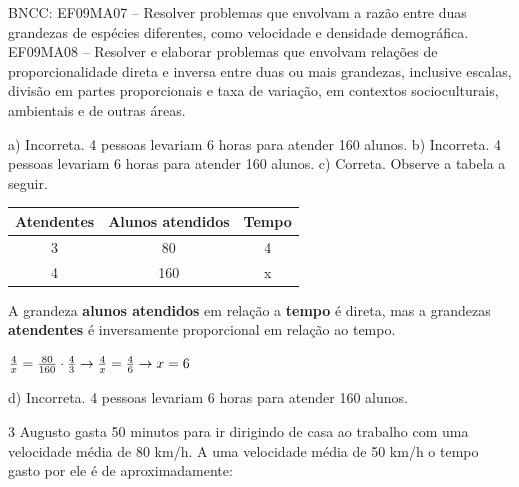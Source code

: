 \begin{escolha}
\begin{boxmedio}
\begin{boxmedio}
{\begin{boxpeq}
\begin{boxpeq}
{\begin{boxpeq}
\begin{boxmedio}
\begin{boxmedio}
\begin{boxpeq}
\begin{boxmedio}
\begin{boxpeq}
\begin{boxpeq}
\begin{boxpeq}
\begin{boxpeq}
\begin{boxmedio}
{\begin{boxmedio}
\begin{boxmedio}
\begin{boxpeq}
\begin{boxmedio}
\begin{boxpeq}
\begin{boxpeq}
\begin{boxpeq}
\begin{escolha}
{\begin{boxmedio}
\begin{boxpeq}
\begin{boxpeq}
\begin{boxpeq}
\begin{boxpeq}
\begin{boxpeq}
\begin{boxmedio}
\begin{boxpeq}
\begin{boxpeq}
\begin{boxpeq}
{\begin{boxpeq}
\begin{boxmedio}
\begin{boxpeq}
\begin{boxpeq}
\begin{boxpeq}
{\begin{boxpeq}
\begin{boxmedio}
{BNCC: EF09MA07 --  Resolver problemas que envolvam a razão entre duas grandezas de espécies diferentes, como velocidade e densidade demográfica.
EF09MA08 -- Resolver e elaborar problemas que envolvam relações de proporcionalidade direta e inversa entre duas ou mais grandezas, inclusive escalas, divisão em partes proporcionais e taxa de variação, em contextos socioculturais, ambientais e de outras áreas.

a) Incorreta. 4 pessoas levariam 6 horas para atender 160 alunos.
b) Incorreta. 4 pessoas levariam 6 horas para atender 160 alunos.
c) Correta. Observe a tabela a seguir.
\begin{table}[]
\begin{tabular}{|c|c|c|}
\hline
\rowcolor[HTML]{DAE8FC} 
Atendentes & Alunos atendidos & Tempo \\ \hline
3 & 80 & 4 \\ \hline
4 & 160 & x \\ \hline
\end{tabular}
\end{table}

A grandeza \textbf{alunos atendidos} em relação a \textbf{tempo} é direta,
mas a grandezas \textbf{atendentes} é inversamente proporcional em relação 
ao tempo.

$\frac{4}{x} = \frac{80}{160} \cdot \frac{4}{3} \rightarrow \\
\frac{4}{x} = \frac{4}{6} \rightarrow x = 6$

d) Incorreta. 4 pessoas levariam 6 horas para atender 160 alunos.}

\num{3} Augusto gasta 50 minutos para ir dirigindo de casa ao trabalho com
uma velocidade média de 80 km/h. A uma velocidade média de 50 km/h o tempo
gasto por ele é de aproximadamente:

\begin{escolha}


\end{escolha}
\end{boxmedio}
\end{boxpeq}}
\end{boxpeq}
\end{boxpeq}
\end{boxpeq}
\end{boxmedio}
\end{boxpeq}}
\end{boxpeq}
\end{boxpeq}
\end{boxpeq}
\end{boxmedio}
\end{boxpeq}
\end{boxpeq}
\end{boxpeq}
\end{boxpeq}
\end{boxpeq}
\end{boxmedio}}
\end{escolha}
\end{boxpeq}
\end{boxpeq}
\end{boxpeq}
\end{boxmedio}
\end{boxpeq}
\end{boxmedio}
\end{boxmedio}}
\end{boxmedio}
\end{boxpeq}
\end{boxpeq}
\end{boxpeq}
\end{boxpeq}
\end{boxmedio}
\end{boxpeq}
\end{boxmedio}
\end{boxmedio}
\end{boxpeq}}
\end{boxpeq}
\end{boxpeq}}
\end{boxmedio}
\end{boxmedio}
\end{escolha}
